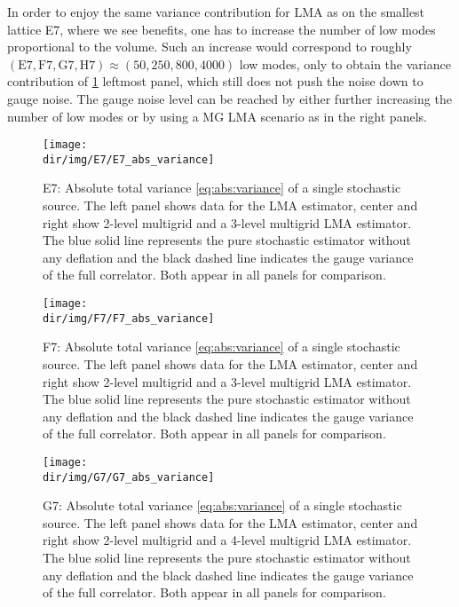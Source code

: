 In order to enjoy the same variance contribution for LMA as on the smallest lattice E7, where we see benefits, one has to increase the number of low modes proportional to the volume.
Such an increase would correspond to roughly $(\text{E7}, \text{F7}, \text{G7}, \text{H7}) \approx (50, 250, 800, 4000)$ low modes, only to obtain the variance contribution of \cref{fig:E7:abs:variance} leftmost panel, which still does not push the  noise down to gauge noise.
The gauge noise level can be reached by either further increasing the number of low modes or by using a MG LMA scenario as in the right panels.

\begin{figure}
\centering
\texttt{[image: \\dir/img/E7/E7\_abs\_variance]}
\caption{
E7: Absolute total variance \cref{eq:abs:variance} of a single stochastic source.
The left panel shows data for the LMA estimator, center and right show 2-level multigrid and a 3-level multigrid LMA estimator.
The blue solid line represents the pure stochastic estimator without any deflation and the black dashed line indicates the gauge variance of the full correlator. Both appear in all panels for comparison.
\takenpart
}
\label{fig:E7:abs:variance}
\end{figure}

\begin{figure}
\centering
\texttt{[image: \\dir/img/F7/F7\_abs\_variance]}
\caption{
F7: Absolute total variance \cref{eq:abs:variance} of a single stochastic source.
The left panel shows data for the LMA estimator, center and right show 2-level multigrid and a 3-level multigrid LMA estimator.
The blue solid line represents the pure stochastic estimator without any deflation and the black dashed line indicates the gauge variance of the full correlator. Both appear in all panels for comparison.
\takenpart
}
\label{fig:F7:abs:variance}
\end{figure}

\begin{figure}
\centering
\texttt{[image: \\dir/img/G7/G7\_abs\_variance]}
\caption{
G7: Absolute total variance \cref{eq:abs:variance} of a single stochastic source.
The left panel shows data for the LMA estimator, center and right show 2-level multigrid and a 4-level multigrid LMA estimator.
The blue solid line represents the pure stochastic estimator without any deflation and the black dashed line indicates the gauge variance of the full correlator. Both appear in all panels for comparison.
\takenpart
}
\label{fig:G7:abs:variance}
\end{figure}


